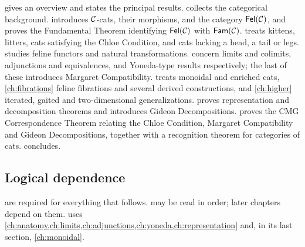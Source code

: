  gives an overview and states the principal results.
 collects the categorical background. 
introduces $\mathcal{C}$-cats, their morphisms, and the category $\mathsf{Fel}(\mathcal{C})$, and
proves the Fundamental Theorem identifying $\mathsf{Fel}(\mathcal{C})$ with $\mathsf{Fam}(\mathcal{C})$.
 treats kittens, litters, cats satisfying the Chloe
Condition, and cats lacking a head, a tail or legs.
 studies feline functors and natural transformations.
 concern limits and colimits,
adjunctions and equivalences, and Yoneda-type results respectively; the last
of these introduces Margaret Compatibility.
 treats monoidal and enriched cats, \cref{ch:fibrations}
feline fibrations and several derived constructions, and \cref{ch:higher}
iterated, gaited and two-dimensional generalizations.
 proves representation and decomposition theorems and
introduces Gideon Decompositions.  proves the CMG Correspondence
Theorem relating the Chloe Condition, Margaret Compatibility and Gideon
Decompositions, together with a recognition theorem for categories of cats.
 concludes.

\subsection*{Logical dependence}

 are required for everything that follows.
 may be read in order;
later chapters depend on them.  uses
\cref{ch:anatomy,ch:limits,ch:adjunctions,ch:yoneda,ch:representation} and, in its
last section, \cref{ch:monoidal}.
